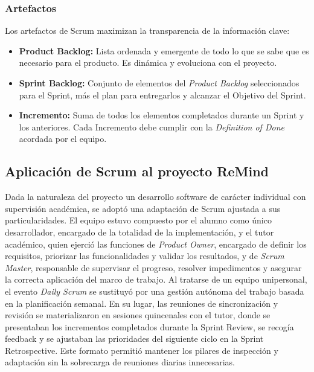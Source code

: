 \subsubsection{Artefactos}

Los artefactos de Scrum maximizan la transparencia de la información clave:

\begin{itemize}
    \item \textbf{Product Backlog:} Lista ordenada y emergente de todo lo que se sabe que es necesario para el producto. Es dinámica y evoluciona con el proyecto.
    \item \textbf{Sprint Backlog:} Conjunto de elementos del \textit{Product Backlog} seleccionados para el Sprint, más el plan para entregarlos y alcanzar el Objetivo del Sprint.
    \item \textbf{Incremento:} Suma de todos los elementos completados durante un Sprint y los anteriores. Cada Incremento debe cumplir con la \textit{Definition of Done} acordada por el equipo.
\end{itemize}

\subsection{Aplicación de Scrum al proyecto ReMind}

Dada la naturaleza del proyecto un desarrollo software de carácter individual con supervisión académica, se adoptó una adaptación de Scrum ajustada a sus particularidades. El equipo estuvo compuesto por el alumno como único desarrollador, encargado de la totalidad de la implementación, y el tutor académico, quien ejerció las funciones de \textit{Product Owner}, encargado de definir los requisitos, priorizar las funcionalidades y validar los resultados, y de \textit{Scrum Master}, responsable de supervisar el progreso, resolver impedimentos y asegurar la correcta aplicación del marco de trabajo. Al tratarse de un equipo unipersonal, el evento \textit{Daily Scrum} se sustituyó por una gestión autónoma del trabajo basada en la planificación semanal. En su lugar, las reuniones de sincronización y revisión se materializaron en sesiones quincenales con el tutor, donde se presentaban los incrementos completados durante la Sprint Review, se recogía feedback y se ajustaban las prioridades del siguiente ciclo en la Sprint Retrospective. Este formato permitió mantener los pilares de inspección y adaptación sin la sobrecarga de reuniones diarias innecesarias.

